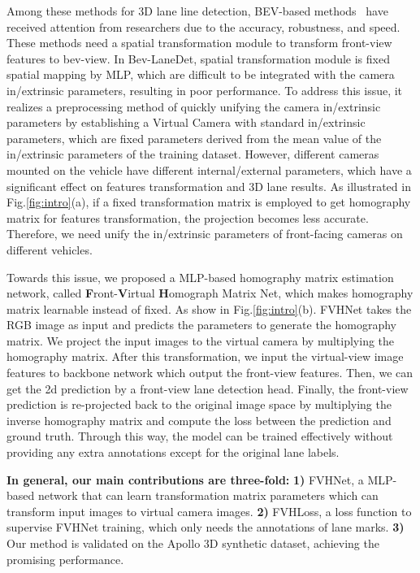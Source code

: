 Among these methods for 3D lane line detection, BEV-based methods~\cite{chen2022persformer, efrat20203d, guo2020gen, liu2022learning, wang2023bev} have received attention from researchers due to the accuracy, robustness, and speed.
These methods need a spatial transformation module to transform front-view features to bev-view.
In Bev-LaneDet\cite{wang2023bev}, spatial transformation module is fixed spatial mapping by MLP,
which are difficult to be integrated with the camera in/extrinsic parameters, resulting in poor performance.
To address this issue, it realizes a preprocessing method of quickly
unifying the camera in/extrinsic parameters by establishing
a Virtual Camera with standard in/extrinsic parameters, which are fixed parameters derived from the mean value of the in/extrinsic
parameters of the training dataset.
However, different cameras mounted on the vehicle have different internal/external parameters, which have a significant effect on features transformation and 3D lane results.
As illustrated in Fig.\ref{fig:intro}(a)\@, if a fixed transformation matrix is employed to get homography matrix for features transformation, the projection becomes less accurate.
Therefore, we need unify the in/extrinsic parameters of front-facing cameras on different vehicles.

Towards this issue, we proposed a MLP-based homography matrix estimation network,
called \textbf{F}ront-\textbf{V}irtual \textbf{H}omograph Matrix Net, which makes homography matrix learnable instead of fixed.
As show in Fig.\ref{fig:intro}(b)\@. FVHNet takes the RGB image as input and predicts the parameters to generate the homography matrix.
We project the input images to the virtual camera by multiplying the homography matrix.
After this transformation, we input the virtual-view image features to backbone network which output the front-view features.
Then, we can get the 2d prediction by a front-view lane detection head.
Finally, the front-view prediction is re-projected back to the original image space by multiplying the inverse homography matrix
and compute the loss between the prediction and ground truth.
Through this way, the model can be trained effectively without providing any extra annotations except for the original lane labels.


\textbf{In general, our main contributions are three-fold:}
\textbf{1)} FVHNet, a MLP-based network that can learn transformation matrix parameters which can transform input images to virtual camera images.
\textbf{2)} FVHLoss, a loss function to supervise FVHNet training, which only needs the annotations of lane marks.
\textbf{3)} Our method is validated on the Apollo 3D synthetic dataset, achieving the promising performance. %